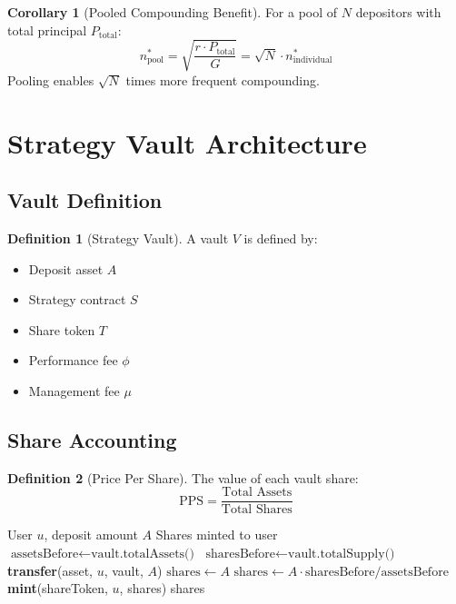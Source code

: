 \documentclass[11pt,a4paper]{article}
\theoremstyle{definition}
\newtheorem{definition}{Definition}
\newtheorem{corollary}{Corollary}
\begin{document}
\begin{corollary}[Pooled Compounding Benefit]
For a pool of $N$ depositors with total principal $P_{\text{total}}$:
\begin{equation}
n^*_{\text{pool}} = \sqrt{\frac{r \cdot P_{\text{total}}}{G}} = \sqrt{N} \cdot n^*_{\text{individual}}
\end{equation}
Pooling enables $\sqrt{N}$ times more frequent compounding.
\end{corollary}

\section{Strategy Vault Architecture}

\subsection{Vault Definition}

\begin{definition}[Strategy Vault]
A vault $V$ is defined by:
\begin{itemize}
\item Deposit asset $A$
\item Strategy contract $S$
\item Share token $T$
\item Performance fee $\phi$
\item Management fee $\mu$
\end{itemize}
\end{definition}

\subsection{Share Accounting}

\begin{definition}[Price Per Share]
The value of each vault share:
\begin{equation}
\text{PPS} = \frac{\text{Total Assets}}{\text{Total Shares}}
\end{equation}
\end{definition}

\begin{algorithm}
\caption{Deposit into Vault}
\begin{algorithmic}[1]
\Require User $u$, deposit amount $A$
\Ensure Shares minted to user
\State $\text{assetsBefore} \gets \text{vault.totalAssets()}$
\State $\text{sharesBefore} \gets \text{vault.totalSupply()}$
\State \textbf{transfer}(asset, $u$, vault, $A$)
\State $\text{shares} \gets A$ 
\Else
\State $\text{shares} \gets A \cdot \text{sharesBefore} / \text{assetsBefore}$
\EndIf
\State \textbf{mint}(shareToken, $u$, shares)
\State \Return shares
\end{algorithmic}
\end{algorithm}
\end{document}
